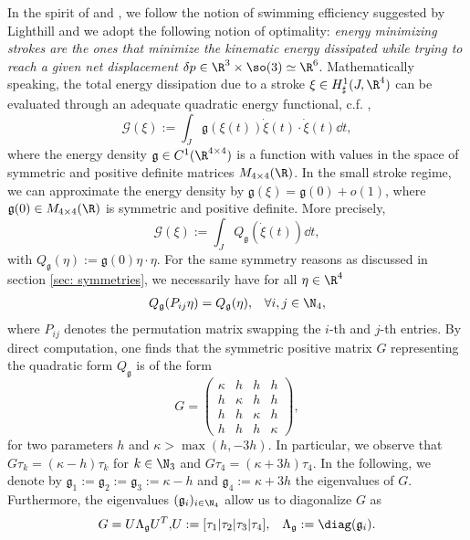 \label{sec: optimization}
In the spirit of \cite{Alouges2013} and \cite{Alouges2017}, we follow the notion of swimming efficiency suggested by Lighthill \cite{Lighthill1952} and we adopt the following notion of optimality: \emph{energy minimizing strokes are the ones that minimize the kinematic energy dissipated while trying to reach a given net displacement} $\delta p \in \R^3 \times \so(3) \simeq \R^6$. Mathematically speaking, the total energy dissipation due to a stroke $\xi \in H^1_{\sharp}(J, \R^4)$ can be evaluated through an adequate quadratic energy functional, c.f. \cite{Alouges2013},
\begin{equation}
 \mathcal{G}(\xi) := \int_{J} \mathfrak{g}(\xi(t))\dot{\xi}(t) \cdot \dot{\xi}(t) \dd t,
\end{equation}
where the energy density $\mathfrak{g} \in C^1(\R^{4 \times 4})$ is a function with values in the space of symmetric and positive definite matrices $M_{4 \times 4}(\R)$. In the small stroke regime, we can approximate the energy density by $\mathfrak{g}(\xi) = \mathfrak{g}(0) + o(1)$, where $\mathfrak{g}(0) \in M_{4 \times 4}(\R)$ is symmetric and positive definite. More precisely,
\begin{equation}
\label{eq: linearized energy functional}
	\mathcal{G}(\xi) := \int_{J} Q_{\mathfrak{g}}(\dot{\xi}(t))\dd t,
\end{equation}
with $Q_{\mathfrak{g}}(\eta) := \mathfrak{g}(0)\eta \cdot \eta$. For the same symmetry reasons as discussed in section \ref{sec: symmetries}, we necessarily have for all $\eta \in \R^4$
\begin{eqnarray}
	Q_{\mathfrak{g}}(P_{ij} \eta) = Q_{\mathfrak{g}}(\eta), & &\forall i,j \in \N_4,
\end{eqnarray}
where $P_{ij}$ denotes the permutation matrix swapping the $i$-th and $j$-th entries. By direct computation, one finds that the symmetric positive matrix $G$ representing the quadratic form $Q_{\mathfrak{g}}$ is of the form
\begin{equation}
G = \left ( \begin{array}{cccc}
\kappa & h & h & h \\ 
h & \kappa & h & h \\ 
h & h & \kappa & h \\ 
h & h & h & \kappa
\end{array} \right ),
\end{equation}
for two parameters $h$ and $\kappa > \max(h, -3h)$. In particular, we observe that $G \tau_k = (\kappa - h ) \tau_k$ for $k \in  \N_3$ and $G \tau_4 = (\kappa + 3h) \tau_4$. In the following, we denote by $\mathfrak{g}_1 := \mathfrak{g}_2 := \mathfrak{g}_3 := \kappa - h$ and $\mathfrak{g}_4 := \kappa + 3h$ the eigenvalues of $G$. Furthermore, the eigenvalues $(\mathfrak{g}_i)_{i \in \N_4}$ allow us to diagonalize  $G$ as
\begin{eqnarray}
G = U \Lambda_{\mathfrak{g}} U^T, & U := [\tau_1 | \tau_2 |\tau_3 |\tau_4], & \Lambda_{\mathfrak{g}} := \diag(\mathfrak{g}_i).
\end{eqnarray}

